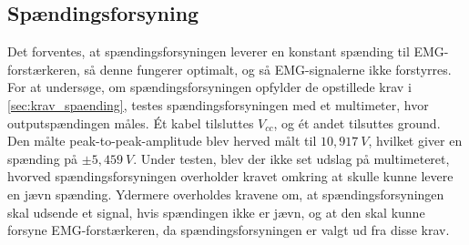 \subsection{Spændingsforsyning}

Det forventes, at spændingsforsyningen leverer en konstant spænding til EMG-forstærkeren, så denne fungerer optimalt, og så EMG-signalerne ikke forstyrres. For at undersøge, om spændingsforsyningen opfylder de opstillede krav i \ref{sec:krav_spaending}, testes spændingsforsyningen med et multimeter, hvor outputspændingen måles. Ét kabel tilsluttes $V_{cc}$, og ét andet tilsuttes ground. Den målte peak-to-peak-amplitude blev herved målt til $10,917~V$, hvilket giver en spænding på $\pm 5,459~V$. Under testen, blev der ikke set udslag på multimeteret, hvorved spændingsforsyningen overholder kravet omkring at skulle kunne levere en jævn spænding. 
Ydermere overholdes kravene om, at spændingsforsyningen skal udsende et signal, hvis spændingen ikke er jævn, og at den skal kunne forsyne EMG-forstærkeren, da spændingsforsyningen er valgt ud fra disse krav. 
